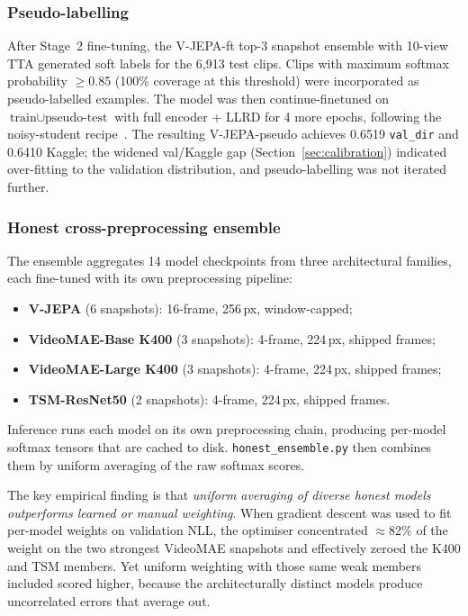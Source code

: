 \documentclass[10pt,twocolumn,letterpaper]{article}
\begin{document}
\subsubsection{Pseudo-labelling}
\label{sec:pseudo}

After Stage~2 fine-tuning, the V-JEPA-ft top-3 snapshot ensemble with
10-view TTA generated soft labels for the 6{,}913 test clips.  Clips
with maximum softmax probability $\geq$0.85 (100\% coverage at this
threshold) were incorporated as pseudo-labelled examples.  The model was
then continue-finetuned on
$\text{train} \cup \text{pseudo-test}$ with full encoder + LLRD for 4
more epochs, following the noisy-student
recipe~\cite{lee2013pseudo,xie2020noisy}.  The resulting V-JEPA-pseudo
achieves 0.6519 \texttt{val\_dir} and 0.6410 Kaggle; the widened
val/Kaggle gap (Section~\ref{sec:calibration}) indicated over-fitting to
the validation distribution, and pseudo-labelling was not iterated
further.

\subsubsection{Honest cross-preprocessing ensemble}
\label{sec:ensemble}

The ensemble aggregates 14 model checkpoints from three architectural
families, each fine-tuned with its own preprocessing pipeline:
\begin{itemize}[noitemsep,topsep=2pt,leftmargin=12pt]
  \item \textbf{V-JEPA} (6 snapshots): 16-frame, 256\,px, window-capped;
  \item \textbf{VideoMAE-Base K400} (3 snapshots): 4-frame, 224\,px, shipped frames;
  \item \textbf{VideoMAE-Large K400} (3 snapshots): 4-frame, 224\,px, shipped frames;
  \item \textbf{TSM-ResNet50} (2 snapshots): 4-frame, 224\,px, shipped frames.
\end{itemize}
Inference runs each model on its own preprocessing chain, producing
per-model softmax tensors that are cached to disk.
\texttt{honest\_ensemble.py} then combines them by uniform averaging of
the raw softmax scores.

The key empirical finding is that \emph{uniform averaging of diverse
honest models outperforms learned or manual weighting}.  When gradient
descent was used to fit per-model weights on validation NLL, the
optimiser concentrated $\approx$82\% of the weight on the two strongest
VideoMAE snapshots and effectively zeroed the K400 and TSM members.
Yet uniform weighting with those same weak members included scored
higher, because the architecturally distinct models produce uncorrelated
errors that average out.
\end{document}
